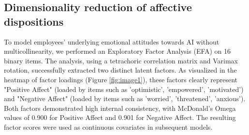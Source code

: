 \documentclass[]{article}
\begin{document}
\begin{table}[t]
\centering
\caption{LCA Class Sizes and Conditional Response Probabilities for the 3-Class Solution.}
\label{tab:lca_probs}
\end{table}

\subsection{Dimensionality reduction of affective dispositions}
To model employees' underlying emotional attitudes towards AI without multicollinearity, we performed an Exploratory Factor Analysis (EFA) on 16 binary items. The analysis, using a tetrachoric correlation matrix and Varimax rotation, successfully extracted two distinct latent factors. As visualized in the heatmap of factor loadings (Figure \ref{fig:image1}), these factors clearly represent "Positive Affect" (loaded by items such as 'optimistic', 'empowered', 'motivated') and "Negative Affect" (loaded by items such as 'worried', 'threatened', 'anxious'). Both factors demonstrated high internal consistency, with McDonald's Omega values of 0.900 for Positive Affect and 0.901 for Negative Affect. The resulting factor scores were used as continuous covariates in subsequent models.
\end{document}
